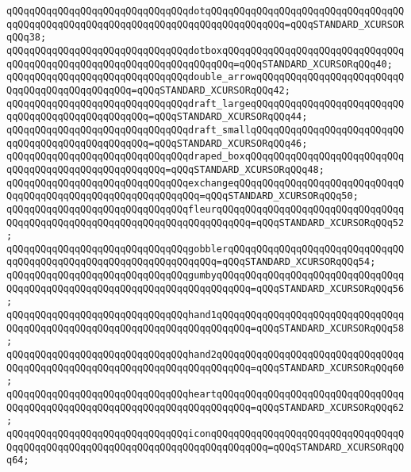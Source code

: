 \verb|qQQqqQQqqQQqqQQqqQQqqQQqqQQqqQQqdotqQQqqQQqqQQqqQQqqQQqqQQqqQQqqQQqqQQqqQQqqQQqqQQqqQQqqQQqqQQqqQQqqQQqqQQqqQQqqQQqqQQq=qQQqSTANDARD_XCURSORqQQq38;|\newline
\verb|qQQqqQQqqQQqqQQqqQQqqQQqqQQqqQQqdotboxqQQqqQQqqQQqqQQqqQQqqQQqqQQqqQQqqQQqqQQqqQQqqQQqqQQqqQQqqQQqqQQqqQQqqQQq=qQQqSTANDARD_XCURSORqQQq40;|\newline
\verb|qQQqqQQqqQQqqQQqqQQqqQQqqQQqqQQqdouble_arrowqQQqqQQqqQQqqQQqqQQqqQQqqQQqqQQqqQQqqQQqqQQqqQQq=qQQqSTANDARD_XCURSORqQQq42;|\newline
\verb|qQQqqQQqqQQqqQQqqQQqqQQqqQQqqQQqdraft_largeqQQqqQQqqQQqqQQqqQQqqQQqqQQqqQQqqQQqqQQqqQQqqQQqqQQq=qQQqSTANDARD_XCURSORqQQq44;|\newline
\verb|qQQqqQQqqQQqqQQqqQQqqQQqqQQqqQQqdraft_smallqQQqqQQqqQQqqQQqqQQqqQQqqQQqqQQqqQQqqQQqqQQqqQQqqQQq=qQQqSTANDARD_XCURSORqQQq46;|\newline
\verb|qQQqqQQqqQQqqQQqqQQqqQQqqQQqqQQqdraped_boxqQQqqQQqqQQqqQQqqQQqqQQqqQQqqQQqqQQqqQQqqQQqqQQqqQQqqQQq=qQQqSTANDARD_XCURSORqQQq48;|\newline
\verb|qQQqqQQqqQQqqQQqqQQqqQQqqQQqqQQqexchangeqQQqqQQqqQQqqQQqqQQqqQQqqQQqqQQqqQQqqQQqqQQqqQQqqQQqqQQqqQQqqQQq=qQQqSTANDARD_XCURSORqQQq50;|\newline
\verb|qQQqqQQqqQQqqQQqqQQqqQQqqQQqqQQqfleurqQQqqQQqqQQqqQQqqQQqqQQqqQQqqQQqqQQqqQQqqQQqqQQqqQQqqQQqqQQqqQQqqQQqqQQqqQQq=qQQqSTANDARD_XCURSORqQQq52;|\newline
\verb|qQQqqQQqqQQqqQQqqQQqqQQqqQQqqQQqgobblerqQQqqQQqqQQqqQQqqQQqqQQqqQQqqQQqqQQqqQQqqQQqqQQqqQQqqQQqqQQqqQQqqQQq=qQQqSTANDARD_XCURSORqQQq54;|\newline
\verb|qQQqqQQqqQQqqQQqqQQqqQQqqQQqqQQqgumbyqQQqqQQqqQQqqQQqqQQqqQQqqQQqqQQqqQQqqQQqqQQqqQQqqQQqqQQqqQQqqQQqqQQqqQQqqQQq=qQQqSTANDARD_XCURSORqQQq56;|\newline
\verb|qQQqqQQqqQQqqQQqqQQqqQQqqQQqqQQqhand1qQQqqQQqqQQqqQQqqQQqqQQqqQQqqQQqqQQqqQQqqQQqqQQqqQQqqQQqqQQqqQQqqQQqqQQqqQQq=qQQqSTANDARD_XCURSORqQQq58;|\newline
\verb|qQQqqQQqqQQqqQQqqQQqqQQqqQQqqQQqhand2qQQqqQQqqQQqqQQqqQQqqQQqqQQqqQQqqQQqqQQqqQQqqQQqqQQqqQQqqQQqqQQqqQQqqQQqqQQq=qQQqSTANDARD_XCURSORqQQq60;|\newline
\verb|qQQqqQQqqQQqqQQqqQQqqQQqqQQqqQQqheartqQQqqQQqqQQqqQQqqQQqqQQqqQQqqQQqqQQqqQQqqQQqqQQqqQQqqQQqqQQqqQQqqQQqqQQqqQQq=qQQqSTANDARD_XCURSORqQQq62;|\newline
\verb|qQQqqQQqqQQqqQQqqQQqqQQqqQQqqQQqiconqQQqqQQqqQQqqQQqqQQqqQQqqQQqqQQqqQQqqQQqqQQqqQQqqQQqqQQqqQQqqQQqqQQqqQQqqQQqqQQq=qQQqSTANDARD_XCURSORqQQq64;|\newline
